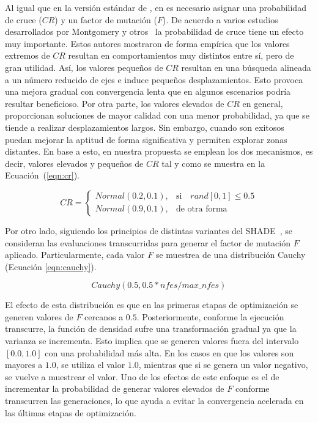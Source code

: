 Al igual que en la versión estándar de \DE{}, en \DEEDM{} es necesario asignar una probabilidad de cruce ($CR$) y un factor de mutación ($F$).
%
De acuerdo a varios estudios desarrollados por Montgomery y otros~\cite{montgomery2010analysis} la probabilidad de cruce tiene un efecto
muy importante.
%
Estos autores mostraron de forma empírica que los valores extremos de $CR$ resultan en comportamientos 
muy distintos entre sí, pero de gran utilidad.
%
Así, los valores pequeños de $CR$ resultan en una búsqueda alineada a un número reducido de ejes e induce pequeños desplazamientos.
%
Esto provoca una mejora gradual con convergencia lenta que en algunos escenarios podría resultar beneficioso.
%
Por otra parte, los valores elevados de $CR$ en general, proporcionan soluciones de mayor calidad con una menor probabilidad, 
ya que se tiende a realizar desplazamientos largos.
%
Sin embargo, cuando son exitosos puedan mejorar la aptitud de forma significativa y permiten explorar zonas distantes.
%
En base a esto, en nuestra propuesta se emplean los dos mecanismos, es decir, valores elevados y pequeños de $CR$ tal y como se muestra
en la Ecuación~(\ref{eqn:cr}).

\begin{equation} \label{eqn:cr}
CR = 
\begin{cases}
     Normal(0.2, 0.1),& \text{si} \quad rand[0,1] \leq 0.5  \\
     Normal(0.9, 0.1),              & \text{de otra forma}
\end{cases}
\end{equation}

Por otro lado, siguiendo los principios de distintas variantes del SHADE~\cite{awad2016ensemble, brest2016shade}, se consideran las evaluaciones transcurridas
para generar el factor de mutación $F$ aplicado.
%
Particularmente, cada valor $F$ se muestrea de una distribución Cauchy (Ecuación \ref{eqn:cauchy}).

\begin{equation}\label{eqn:cauchy}
 Cauchy(0.5, 0.5*nfes/max\_nfes)
\end{equation}

El efecto de esta distribución es que en las primeras etapas de optimización se generen valores de $F$ cercanos a $0.5$.
%
Posteriormente, conforme la ejecución transcurre, la función de densidad sufre una transformación gradual ya que la varianza se incrementa.
%
Esto implica que se generen valores fuera del intervalo $[0.0, 1.0]$ con una probabilidad más alta.
%
En los casos en que los valores son mayores a $1.0$, se utiliza el valor $1.0$, mientras
que si se genera un valor negativo, se vuelve a muestrear el valor.
%
Uno de los efectos de este enfoque es el de incrementar la probabilidad de generar valores elevados de $F$ conforme transcurren las generaciones, lo que ayuda a evitar
la convergencia acelerada en las últimas etapas de optimización.


